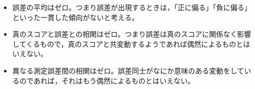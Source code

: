\begin{itemize}
	\item 誤差の平均はゼロ。つまり誤差が出現するときは，「正に偏る」「負に偏る」といった一貫した傾向がないと考える。
	\item 真のスコアと誤差との相関はゼロ。つまり誤差は真のスコアに関係なく影響してくるもので，真のスコアと共変動するようであれば偶然によるものとはいえない。
	\item 異なる測定誤差間の相関はゼロ。誤差同士がなにか意味のある変動をしているのであれば，それはもう偶然によるものとはいえない。
\end{itemize}
